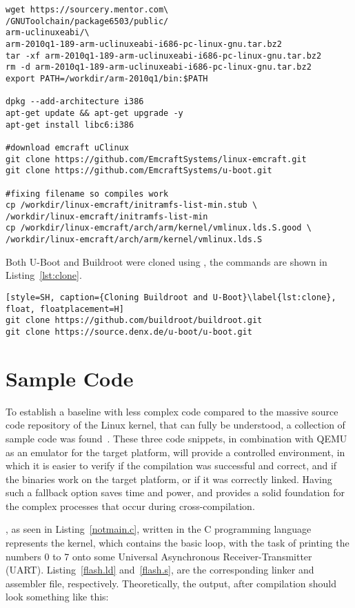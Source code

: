\begin{lstlisting}[style=SH, caption=Downloading $\mu$Clinux into the container and setting up its special toolchain, label=lst:uClinuxsetup, float, floatplacement=H]
wget https://sourcery.mentor.com\
/GNUToolchain/package6503/public/
arm-uclinuxeabi/\
arm-2010q1-189-arm-uclinuxeabi-i686-pc-linux-gnu.tar.bz2
tar -xf arm-2010q1-189-arm-uclinuxeabi-i686-pc-linux-gnu.tar.bz2
rm -d arm-2010q1-189-arm-uclinuxeabi-i686-pc-linux-gnu.tar.bz2
export PATH=/workdir/arm-2010q1/bin:$PATH

dpkg --add-architecture i386
apt-get update && apt-get upgrade -y
apt-get install	libc6:i386

#download emcraft uClinux 
git clone https://github.com/EmcraftSystems/linux-emcraft.git
git clone https://github.com/EmcraftSystems/u-boot.git

#fixing filename so compiles work
cp /workdir/linux-emcraft/initramfs-list-min.stub \
/workdir/linux-emcraft/initramfs-list-min
cp /workdir/linux-emcraft/arch/arm/kernel/vmlinux.lds.S.good \
/workdir/linux-emcraft/arch/arm/kernel/vmlinux.lds.S
\end{lstlisting}

Both U-Boot and Buildroot were cloned using \code{git}, the commands are shown in Listing~\ref{lst:clone}.
\begin{lstlisting}[style=SH, caption={Cloning Buildroot and U-Boot}\label{lst:clone}, float, floatplacement=H]
git clone https://github.com/buildroot/buildroot.git
git clone https://source.denx.de/u-boot/u-boot.git
\end{lstlisting}

\section{Sample Code}
To establish a baseline with less complex code compared to the massive source code repository of the Linux kernel, that can fully be understood, a collection of sample code was found~\cite{sample-code}. These three code snippets, in combination with QEMU as an emulator for the target platform, will provide a controlled environment, in which it is easier to verify if the compilation was successful and correct, and if the binaries work on the target platform, or if it was correctly linked. Having such a fallback option saves time and power, and provides a solid foundation for the complex processes that occur during cross-compilation. 

, as seen in Listing~\ref{notmain.c}, written in the C programming language represents the kernel, which contains the basic loop, with the task of printing the numbers 0 to 7 onto some Universal Asynchronous Receiver-Transmitter (UART). Listing~\ref{flash.ld} and~\ref{flash.s}, are the corresponding linker and assembler file, respectively. Theoretically, the output, after compilation should look something like this:

